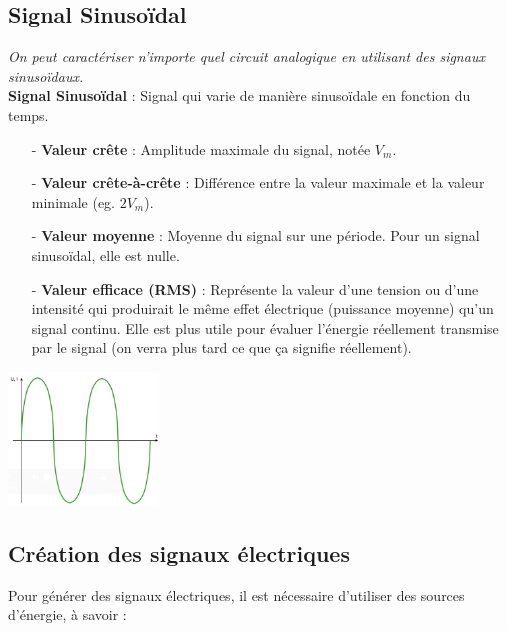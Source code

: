 \subsection{Signal Sinusoïdal}
\textit{On peut caractériser n'importe quel circuit analogique en utilisant des signaux sinusoïdaux.} \\
\textbf{Signal Sinusoïdal} : Signal qui varie de manière sinusoïdale en fonction du temps.

\begin{itemize}
    \item[-] \textbf{Valeur crête} : Amplitude maximale du signal, notée \( V_m \).
    \item[-] \textbf{Valeur crête-à-crête} : Différence entre la valeur maximale et la valeur minimale (eg. \( 2V_m \)).
    \item[-] \textbf{Valeur moyenne} : Moyenne du signal sur une période. Pour un signal sinusoïdal, elle est nulle.
    \item[-] \textbf{Valeur efficace (RMS)} : Représente la valeur d'une tension ou d'une intensité qui produirait le même effet électrique (puissance moyenne) qu'un signal continu. Elle est plus utile pour évaluer l'énergie réellement transmise par le signal (on verra plus tard ce que ça signifie réellement).
\end{itemize}

\begin{center}
    \includegraphics[width=0.3\textwidth]{chapters/chapter1/images/sinus.png}
\end{center}

\subsection{Création des signaux électriques}

Pour générer des signaux électriques, il est nécessaire d'utiliser des sources d'énergie, à savoir :

